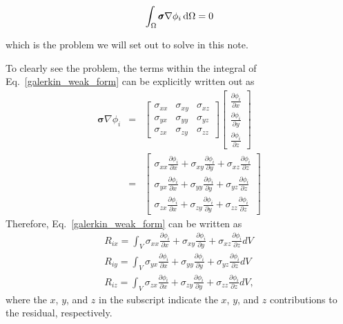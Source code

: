 %
\begin{equation}
\int_\Omega \pmb{\sigma} \nabla \phi_i \mathop{}\!\mathrm{d} \Omega = 0
\label{galerkin_weak_form}
\end{equation}
%

which is the problem we will set out to solve in this note.

To clearly see the problem, the terms within the integral of Eq.\ \eqref{galerkin_weak_form} can be explicitly written out as
%
\begin{eqnarray}
\pmb{\sigma} \nabla \phi_i &=&
\begin{bmatrix}
\sigma_{xx} & \sigma_{xy} & \sigma_{xz} \\
\sigma_{yx} & \sigma_{yy} & \sigma_{yz} \\
\sigma_{zx} & \sigma_{zy} & \sigma_{zz} 
\end{bmatrix}
%
\begin{bmatrix}
\frac{\partial \phi_i}{\partial x} \\ \frac{\partial \phi_i}{\partial y} \\ \frac{\partial \phi_i}{\partial z}
\end{bmatrix} \nonumber\\
%
&=& 
%
\begin{bmatrix}
\sigma_{xx} \frac{\partial \phi_i}{\partial x} + \sigma_{xy} \frac{\partial \phi_i}{\partial y} + \sigma_{xz} \frac{\partial \phi_i}{\partial z} \\
%
\sigma_{yx} \frac{\partial \phi_i}{\partial x} + \sigma_{yy} \frac{\partial \phi_i}{\partial y} + \sigma_{yz} \frac{\partial \phi_i}{\partial z} \\
%
\sigma_{zx} \frac{\partial \phi_i}{\partial x} + \sigma_{zy} \frac{\partial \phi_i}{\partial y} + \sigma_{zz} \frac{\partial \phi_i}{\partial z} 
\end{bmatrix}
%
\end{eqnarray}
%
Therefore, Eq.\ \eqref{galerkin_weak_form} can be written as
%
\begin{eqnarray}
R_{ix} = \int_V \sigma_{xx} \frac{\partial \phi_i}{\partial x} + \sigma_{xy} \frac{\partial \phi_i}{\partial y} + \sigma_{xz} \frac{\partial \phi_i}{\partial z} dV \nonumber\\
%
R_{iy} = \int_V \sigma_{yx} \frac{\partial \phi_i}{\partial x} + \sigma_{yy} \frac{\partial \phi_i}{\partial y} + \sigma_{yz} \frac{\partial \phi_i}{\partial z} dV \nonumber\\
%
R_{iz} = \int_V \sigma_{zx} \frac{\partial \phi_i}{\partial x} + \sigma_{zy} \frac{\partial \phi_i}{\partial y} + \sigma_{zz} \frac{\partial \phi_i}{\partial z}  dV,
\label{residual_xyz}
\end{eqnarray}
%
where the $x$, $y$, and $z$ in the subscript indicate the $x$, $y$, and $z$ contributions to the residual, respectively.

